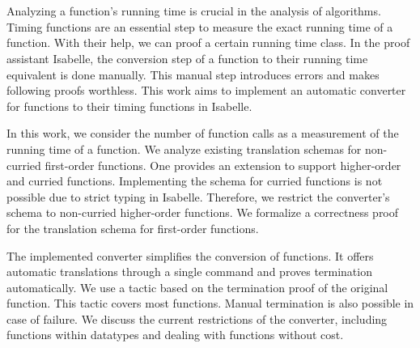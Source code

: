 \chapter{\abstractname}

Analyzing a function's running time is crucial in the analysis of algorithms.
Timing functions are an essential step to measure the exact running time of a function.
With their help, we can proof a certain running time class.
In the proof assistant Isabelle, the conversion step of a function to their running time equivalent is done manually.
This manual step introduces errors and makes following proofs worthless.
This work aims to implement an automatic converter for functions to their timing functions in Isabelle.

In this work, we consider the number of function calls as a measurement of the running time of a function.
We analyze existing translation schemas for non-curried first-order functions.
One provides an extension to support higher-order and curried functions.
Implementing the schema for curried functions is not possible due to strict typing in Isabelle.
Therefore, we restrict the converter's schema to non-curried higher-order functions.
We formalize a correctness proof for the translation schema for first-order functions.

The implemented converter simplifies the conversion of functions.
It offers automatic translations through a single command and proves termination automatically.
We use a tactic based on the termination proof of the original function.
This tactic covers most functions.
Manual termination is also possible in case of failure.
We discuss the current restrictions of the converter, including functions within datatypes and dealing with functions without cost.
